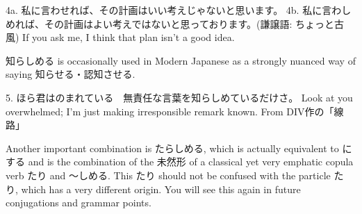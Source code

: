 \par{4a. 私に言わせれば、その計画はいい考えじゃないと思います。 \hfill\break
4b. 私に言わしめれば、その計画はよい考えではないと思っております。(謙譲語: ちょっと古風) \hfill\break
If you ask me, I think that plan isn't a good idea. }

\par{ 知らしめる is occasionally used in Modern Japanese as a strongly nuanced way of saying 知らせる・認知させる. }

\par{5. ほら君はのまれている　無責任な言葉を知らしめているだけさ。 \hfill\break
Look at you overwhelmed; I'm just making irresponsible remark known. \hfill\break
From DIV作の「線路」 }

\par{  Another important combination is たらしめる, which is actually equivalent to にする and is the combination of the 未然形 of a classical yet very emphatic copula verb たり and ～しめる. This たり should not be confused with the particle たり, which has a very different origin. You will see this again in future conjugations and grammar points. }

